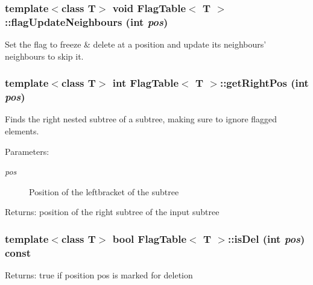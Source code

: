 \subsubsection{\setlength{\rightskip}{0pt plus 5cm}template$<$class T$>$ void {\bf Flag\-Table}$<$ T $>$::flag\-Update\-Neighbours (int {\em pos})\hspace{0.3cm}{\tt  [protected]}}\label{classFlagTable_b0}


Set the flag to freeze \& delete at a position and update its neighbours' neighbours to skip it. 

\subsubsection{\setlength{\rightskip}{0pt plus 5cm}template$<$class T$>$ int {\bf Flag\-Table}$<$ T $>$::get\-Right\-Pos (int {\em pos})}\label{classFlagTable_a21}


Finds the right nested subtree of a subtree, making sure to ignore flagged elements. 

\begin{Desc}
\item[Parameters:]
\begin{description}
\item[{\em pos}]Position of the leftbracket of the subtree \end{description}
\end{Desc}
\begin{Desc}
\item[Returns:]position of the right subtree of the input subtree \end{Desc}
\subsubsection{\setlength{\rightskip}{0pt plus 5cm}template$<$class T$>$ bool {\bf Flag\-Table}$<$ T $>$::is\-Del (int {\em pos}) const\hspace{0.3cm}{\tt  [inline]}}\label{classFlagTable_a15}


\begin{Desc}
\item[Returns:]true if position pos is marked for deletion \end{Desc}
